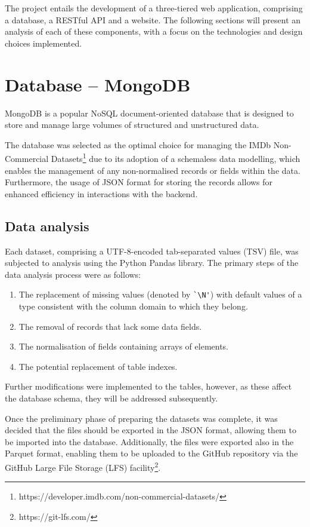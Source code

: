 
The project entails the development of a three-tiered web application, comprising a database, a RESTful API and a website.
The following sections will present an analysis of each of these components, with a focus on the technologies and design choices implemented.

\section{Database -- MongoDB}

MongoDB is a popular NoSQL document-oriented database that is designed to store and manage large volumes of structured and unstructured data.

The database was selected as the optimal choice for managing the IMDb Non-Commercial Datasets\footnote[1]{https://developer.imdb.com/non-commercial-datasets/} due to its adoption of a schemaless data modelling, which enables the management of any non-normalised records or fields within the data.
Furthermore, the usage of JSON format for storing the records allows for enhanced efficiency in interactions with the backend.

\subsection{Data analysis}

Each dataset, comprising a UTF-8-encoded tab-separated values (TSV) file, was subjected to analysis using the Python Pandas library.
The primary steps of the data analysis process were as follows:

\begin{enumerate}
	\item The replacement of missing values (denoted by  \verb|`\N'|) with default values of a type consistent with the column domain to which they belong.
	\item The removal of records that lack some data fields.
	\item The normalisation of fields containing arrays of elements.
	\item The potential replacement of table indexes.
\end{enumerate}

Further modifications were implemented to the tables, however, as these affect the database schema, they will be addressed subsequently.

Once the preliminary phase of preparing the datasets was complete, it was decided that the files should be exported in the JSON format, allowing them to be imported into the database.
Additionally, the files were exported also in the Parquet format, enabling them to be uploaded to the GitHub repository via the GitHub Large File Storage (LFS) facility\footnote[2]{https://git-lfs.com/}. 

